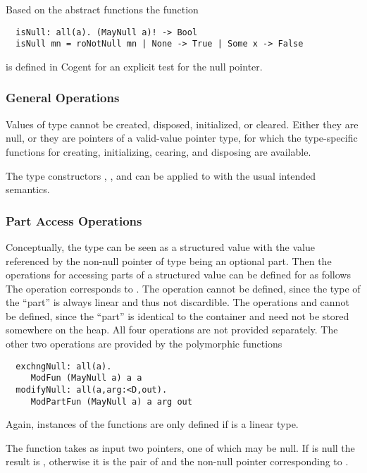 Based on the abstract functions the function
\begin{verbatim}
  isNull: all(a). (MayNull a)! -> Bool
  isNull mn = roNotNull mn | None -> True | Some x -> False
\end{verbatim}
is defined in Cogent for an explicit test for the null pointer.

\subsubsection{General Operations}

Values of type  cannot be created, disposed, initialized, or cleared. Either they are null, or they are pointers of
a valid-value pointer type, for which the type-specific functions for creating, initializing, cearing, and disposing are available.

The type constructors , , and  can be applied to  with the usual intended
semantics.

\subsubsection{Part Access Operations}

Conceptually, the type  can be seen as a structured value with the value referenced by the non-null pointer of type  being
an optional part. Then the operations for accessing parts of a structured value can be defined for  as follows
The operation  corresponds to . The operation  cannot be defined, since the type  of the 
``part'' is always linear and thus not discardible. The operations  and  cannot be defined, since
the ``part'' is identical to the container and need not be stored somewhere on the heap. 
All four operations are not provided separately. The other two operations are provided
by the polymorphic functions
\begin{verbatim}
  exchngNull: all(a).
     ModFun (MayNull a) a a
  modifyNull: all(a,arg:<D,out).
     ModPartFun (MayNull a) a arg out
\end{verbatim}
Again, instances of the functions are only defined if  is a linear type. 

The function  takes as input two pointers, one of which may be null. If  is null the result is
, otherwise it is the pair of  and the non-null pointer corresponding to .

